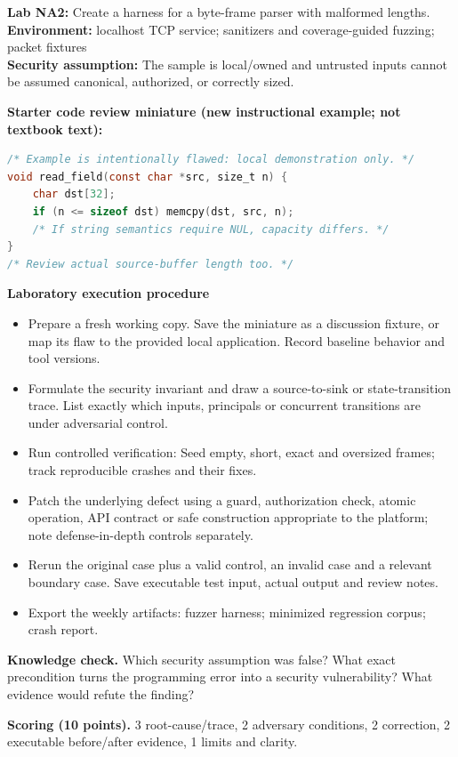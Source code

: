 \documentclass[10pt,letterpaper]{article}
\begin{document}
\begin{insight}\textbf{Lab NA2:} Create a harness for a byte-frame parser with malformed lengths.\\\textbf{Environment:} localhost TCP service; sanitizers and coverage-guided fuzzing; packet fixtures\\\textbf{Security assumption:} The sample is local/owned and untrusted inputs cannot be assumed canonical, authorized, or correctly sized.\end{insight}
\textbf{Starter code review miniature (new instructional example; not textbook text):}
\begin{lstlisting}[language=C]
/* Example is intentionally flawed: local demonstration only. */
void read_field(const char *src, size_t n) {
    char dst[32];
    if (n <= sizeof dst) memcpy(dst, src, n);
    /* If string semantics require NUL, capacity differs. */
}
/* Review actual source-buffer length too. */
\end{lstlisting}
\textbf{Laboratory execution procedure}
\begin{itemize}[leftmargin=*,itemsep=2pt]
\item Prepare a fresh working copy. Save the miniature as a discussion fixture, or map its flaw to the provided local application. Record baseline behavior and tool versions.
\item Formulate the security invariant and draw a source-to-sink or state-transition trace. List exactly which inputs, principals or concurrent transitions are under adversarial control.
\item Run controlled verification: Seed empty, short, exact and oversized frames; track reproducible crashes and their fixes.
\item Patch the underlying defect using a guard, authorization check, atomic operation, API contract or safe construction appropriate to the platform; note defense-in-depth controls separately.
\item Rerun the original case plus a valid control, an invalid case and a relevant boundary case. Save executable test input, actual output and review notes.
\item Export the weekly artifacts: fuzzer harness; minimized regression corpus; crash report.
\end{itemize}
\textbf{Knowledge check.} Which security assumption was false? What exact precondition turns the programming error into a security vulnerability? What evidence would refute the finding?

\textbf{Scoring (10 points).} 3 root-cause/trace, 2 adversary conditions, 2 correction, 2 executable before/after evidence, 1 limits and clarity.
\end{document}
